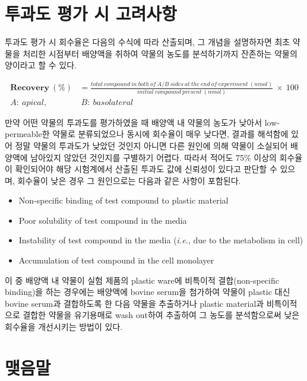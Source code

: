 \documentclass[
  11pt,
  krantz2, a4paper, twoside]{krantz}
\providecommand{\tightlist}{%
  \setlength{\itemsep}{0pt}\setlength{\parskip}{0pt}}
\begin{document}
\section{투과도 평가 시 고려사항}\label{uxd22cuxacfcuxb3c4-uxd3c9uxac00-uxc2dc-uxace0uxb824uxc0acuxd56d}

투과도 평가 시 회수율은 다음의 수식에 따라 산출되며, 그 개념을
설명하자면 최초 약물을 처리한 시점부터 배양액을 취하여 약물의 농도를
분석하기까지 잔존하는 약물의 양이라고 할 수 있다.

\begin{equation}
\begin{split}
\mathbf{Recovery\ }\left( \mathbf{\%} \right) &= \frac{total\ compound\ in\ both\ of\ A/B\ sides\ at\ the\ end\ of\ experiment\ (nmol)}{initial\ compound\ present\ (nmol)}\  \times \ 100 \\
A:\ apical,&\ B:\ basolateral
\end{split}
\label{eq:eq02-03}
\end{equation}

만약 어떤 약물의 투과도를 평가하였을 때 배양액 내 약물의 농도가 낮아서
low-permeable한 약물로 분류되었으나 동시에 회수율이 매우 낮다면, 결과를
해석함에 있어 정말 약물의 투과도가 낮았던 것인지 아니면 다른 원인에 의해
약물이 소실되어 배양액에 남아있지 않았던 것인지를 구별하기 어렵다.
따라서 적어도 75\% 이상의 회수율이 확인되어야 해당 시험계에서 산출된
투과도 값에 신뢰성이 있다고 판단할 수 있으며, 회수율이 낮은 경우 그
원인으로는 다음과 같은 사항이 포함된다.

\begin{itemize}
\tightlist
\item
  Non-specific binding of test compound to plastic material
\item
  Poor solubility of test compound in the media
\item
  Instability of test compound in the media (\emph{i.e.}, due to the
  metabolism in cell)
\item
  Accumulation of test compound in the cell monolayer
\end{itemize}

이 중 배양액 내 약물이 실험 제품의 plastic ware에 비특이적
결합(non-specific binding)을 하는 경우에는 배양액에 bovine serum을
첨가하여 약물이 plastic 대신 bovine serum과 결합하도록 한 다음 약물을
추출하거나 plastic material과 비특이적으로 결합한 약물을 유기용매로 wash
out하여 추출하여 그 농도를 분석함으로써 낮은 회수율을 개선시키는 방법이
있다.

\section{맺음말}\label{uxb9fauxc74cuxb9d0-1}
\end{document}
